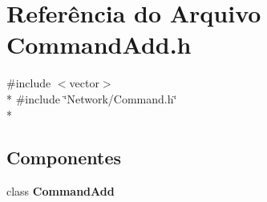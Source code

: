 \section{Referência do Arquivo Command\+Add.\+h}
\label{_command_add_8h}
{\ttfamily \#include $<$vector$>$}\\*
{\ttfamily \#include \char`\"{}Network/\+Command.\+h\char`\"{}}\\*
\subsection*{Componentes}
\begin{DoxyCompactItemize}
\item 
class {\bf Command\+Add}
\end{DoxyCompactItemize}
